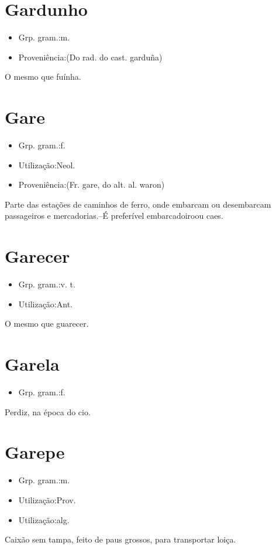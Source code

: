 \section{Gardunho}
\begin{itemize}
\item {Grp. gram.:m.}
\end{itemize}
\begin{itemize}
\item {Proveniência:(Do rad. do cast. \textunderscore garduña\textunderscore )}
\end{itemize}
O mesmo que \textunderscore fuínha\textunderscore .
\section{Gare}
\begin{itemize}
\item {Grp. gram.:f.}
\end{itemize}
\begin{itemize}
\item {Utilização:Neol.}
\end{itemize}
\begin{itemize}
\item {Proveniência:(Fr. \textunderscore gare\textunderscore , do alt. al. \textunderscore waron\textunderscore )}
\end{itemize}
Parte das estações de caminhos de ferro, onde embarcam ou desembarcam passageiros e mercadorias.--É preferível \textunderscore embarcadoiro\textunderscore  ou \textunderscore caes\textunderscore .
\section{Garecer}
\begin{itemize}
\item {Grp. gram.:v. t.}
\end{itemize}
\begin{itemize}
\item {Utilização:Ant.}
\end{itemize}
O mesmo que \textunderscore guarecer\textunderscore .
\section{Garela}
\begin{itemize}
\item {Grp. gram.:f.}
\end{itemize}
Perdiz, na época do cio.
\section{Garepe}
\begin{itemize}
\item {Grp. gram.:m.}
\end{itemize}
\begin{itemize}
\item {Utilização:Prov.}
\end{itemize}
\begin{itemize}
\item {Utilização:alg.}
\end{itemize}
Caixão sem tampa, feito de paus grossos, para transportar loiça.
